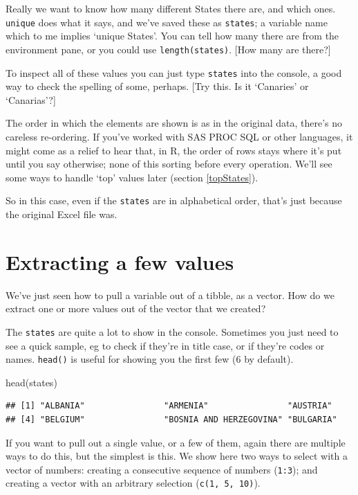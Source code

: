 \documentclass[
]{book}
\newenvironment{Shaded}{\begin{snugshade}}{\end{snugshade}}
\newcommand{\FunctionTok}[1]{\textcolor[rgb]{0.00,0.00,0.00}{#1}}
\newcommand{\NormalTok}[1]{#1}
\begin{document}
Really we want to know how many different States there are, and which ones. \texttt{unique} does what it says, and we've saved these as \texttt{states}; a variable name which to me implies `unique States'. You can tell how many there are from the environment pane, or you could use \texttt{length(states)}. {[}How many are there?{]}

To inspect all of these values you can just type \texttt{states} into the console, a good way to check the spelling of some, perhaps. {[}Try this. Is it `Canaries' or `Canarias'?{]}

The order in which the elements are shown is as in the original data, there's no careless re-ordering. If you've worked with SAS PROC SQL or other languages, it might come as a relief to hear that, in R, the order of rows stays where it's put until you say otherwise; none of this sorting before every operation. We'll see some ways to handle `top' values later (section \ref{topStates}).

So in this case, even if the \texttt{states} are in alphabetical order, that's just because the original Excel file was.

\hypertarget{someValues}{%
\section{Extracting a few values}\label{someValues}}

We've just seen how to pull a variable out of a tibble, as a vector. How do we extract one or more values out of the vector that we created?

The \texttt{states} are quite a lot to show in the console. Sometimes you just need to see a quick sample, eg to check if they're in title case, or if they're codes or names. \texttt{head()} is useful for showing you the first few (6 by default).

\begin{Shaded}
\begin{Highlighting}[]
\FunctionTok{head}\NormalTok{(states)}
\end{Highlighting}
\end{Shaded}

\begin{verbatim}
## [1] "ALBANIA"                "ARMENIA"                "AUSTRIA"               
## [4] "BELGIUM"                "BOSNIA AND HERZEGOVINA" "BULGARIA"
\end{verbatim}

If you want to pull out a single value, or a few of them, again there are multiple ways to do this, but the simplest is this. We show here two ways to select with a vector of numbers: creating a consecutive sequence of numbers (\texttt{1:3}); and creating a vector with an arbitrary selection (\texttt{c(1,\ 5,\ 10)}).
\end{document}

